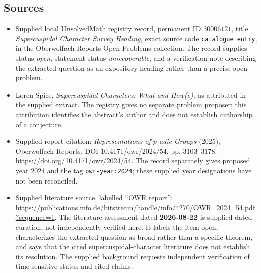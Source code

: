 \documentclass[11pt]{article}
\begin{document}
\subsection{Sources}
\begin{itemize}
\item Supplied local UnsolvedMath registry record, permanent ID \(30006121\), title \emph{Supercuspidal Character Survey Heading}, exact source code \texttt{catalogue entry}, in the Oberwolfach Reports Open Problems collection. The record supplies status \emph{open}, statement status \emph{unrecoverable}, and a verification note describing the extracted question as an expository heading rather than a precise open problem.
\item Loren Spice, \emph{Supercuspidal Characters: What and How(e)}, as attributed in the supplied extract. The registry gives no separate problem proposer; this attribution identifies the abstract's author and does not establish authorship of a conjecture.
\item Supplied report citation: \emph{Representations of \(p\)-adic Groups} (2025), Oberwolfach Reports, DOI 10.4171/owr/2024/54, pp. 3103--3178. \url{https://doi.org/10.4171/owr/2024/54}. The record separately gives proposed year 2024 and the tag \texttt{owr-year:2024}; these supplied year designations have not been reconciled.
\item Supplied literature source, labelled ``OWR report'': \url{https://publications.mfo.de/bitstream/handle/mfo/4270/OWR_2024_54.pdf?sequence=1}. The literature assessment dated \textbf{2026-08-22} is supplied dated curation, not independently verified here. It labels the item open, characterizes the extracted question as broad rather than a specific theorem, and says that the cited supercuspidal-character literature does not establish its resolution. The supplied background requests independent verification of time-sensitive status and cited claims.
\end{itemize}
\end{document}
